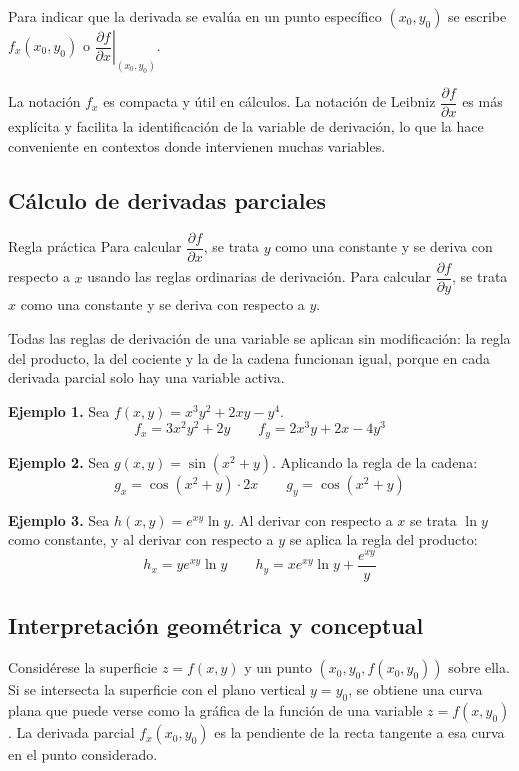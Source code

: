 Para indicar que la derivada se evalúa en un punto específico $(x_0, y_0)$ se escribe $f_x(x_0, y_0)$ o $\left.\dfrac{\partial f}{\partial x}\right|_{(x_0,y_0)}$.

La notación $f_x$ es compacta y útil en cálculos. La notación de Leibniz $\dfrac{\partial f}{\partial x}$ es más explícita y facilita la identificación de la variable de derivación, lo que la hace conveniente en contextos donde intervienen muchas variables.

\subsection{Cálculo de derivadas parciales}

\begin{mynote}{Regla práctica}
Para calcular $\dfrac{\partial f}{\partial x}$, se trata $y$ como una constante y se deriva con respecto a $x$ usando las reglas ordinarias de derivación. Para calcular $\dfrac{\partial f}{\partial y}$, se trata $x$ como una constante y se deriva con respecto a $y$.
\end{mynote}

Todas las reglas de derivación de una variable se aplican sin modificación: la regla del producto, la del cociente y la de la cadena funcionan igual, porque en cada derivada parcial solo hay una variable activa.

\textbf{Ejemplo 1.} Sea $f(x, y) = x^3 y^2 + 2xy - y^4$.
\[
f_x = 3x^2 y^2 + 2y \qquad f_y = 2x^3 y + 2x - 4y^3
\]

\textbf{Ejemplo 2.} Sea $g(x, y) = \sin(x^2 + y)$. Aplicando la regla de la cadena:
\[
g_x = \cos(x^2 + y) \cdot 2x \qquad g_y = \cos(x^2 + y)
\]

\textbf{Ejemplo 3.} Sea $h(x, y) = e^{xy} \ln y$. Al derivar con respecto a $x$ se trata $\ln y$ como constante, y al derivar con respecto a $y$ se aplica la regla del producto:
\[
h_x = y e^{xy} \ln y \qquad h_y = x e^{xy} \ln y + \frac{e^{xy}}{y}
\]

\subsection{Interpretación geométrica y conceptual}

Considérese la superficie $z = f(x, y)$ y un punto $(x_0, y_0, f(x_0, y_0))$ sobre ella. Si se intersecta la superficie con el plano vertical $y = y_0$, se obtiene una curva plana que puede verse como la gráfica de la función de una variable $z = f(x, y_0)$. La derivada parcial $f_x(x_0, y_0)$ es la pendiente de la recta tangente a esa curva en el punto considerado.

